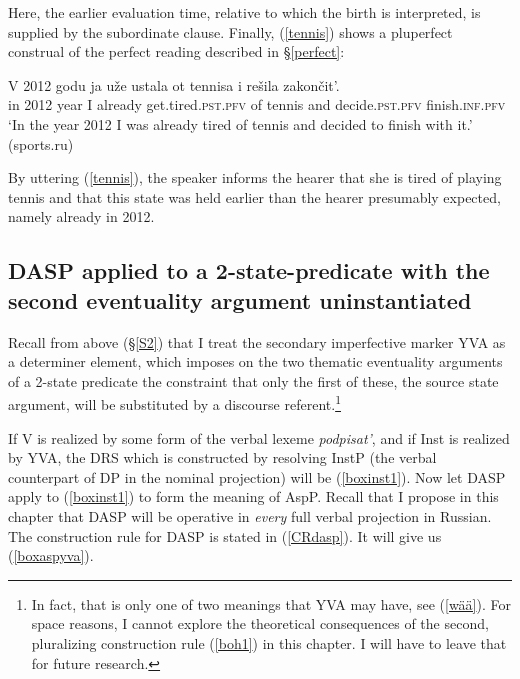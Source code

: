 \documentclass[output=paper,colorlinks,citecolor=brown]{langscibook}
\begin{document}
\noindent Here, the earlier evaluation time, relative to which the birth is interpreted, is supplied by the subordinate clause. 
Finally, (\ref{tennis}) shows a pluperfect construal of the perfect reading described in \S \ref{perfect}:   

\ea\label{tennis}
\gll V
2012 godu ja uže
ustala ot tennisa i rešila zakončit'.\\
in 2012 year I already get.tired.\textsc{pst.pfv} 
of tennis and decide.\textsc{pst.pfv} finish.\textsc{inf.pfv} \\
\glt `In the year 2012 I was already tired of tennis and decided to finish with it.' \hfill (sports.ru)
\z 

\noindent By uttering (\ref{tennis}), the speaker informs the hearer that she is tired of playing tennis 
and that this state was held earlier than the hearer presumably expected, namely already in 2012.  

\subsection{DASP applied to a 2-state-predicate with the second eventuality argument uninstantiated}\label{daspthree}
Recall from above (\S \ref{S2}) that I treat the secondary imperfective marker YVA as a determiner element, which imposes on the two thematic eventuality arguments of a 2-state predicate the constraint that only the first of these, the source state argument, will be substituted by a discourse referent.\footnote{In fact, that is only one of two meanings that YVA may have, see (\ref{wää}). For space reasons, I cannot explore the theoretical consequences of the second, pluralizing construction rule (\ref{boh1}) in this chapter. I will have to leave that for future research.}    

If V is realized by some form of the verbal lexeme \textit{podpisat'}, and if Inst is realized by YVA, the DRS which is constructed by resolving InstP (the verbal counterpart of DP in the nominal projection) will be (\ref{boxinst1}).
Now let DASP apply to (\ref{boxinst1}) to form the meaning of AspP. Recall that I propose in this chapter that DASP will be operative in \textit{every} full verbal projection in Russian.
The construction rule for DASP is stated in (\ref{CRdasp}). It will give us (\ref{boxaspyva}).

\end{document}
